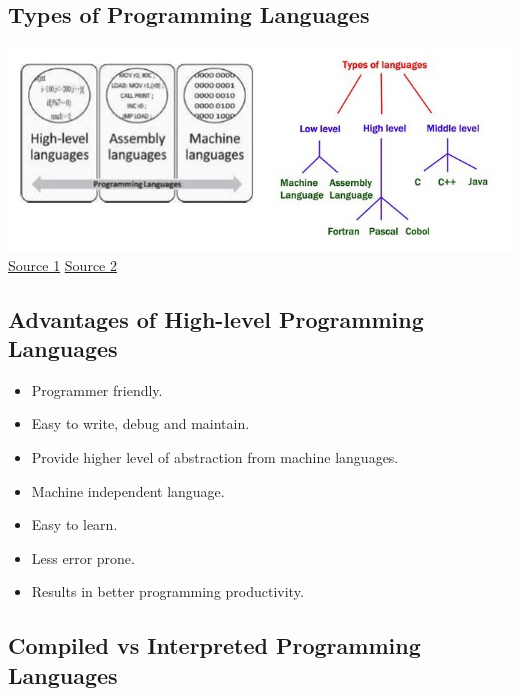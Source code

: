\documentclass[11pt]{article}
\makeatletter
\def\maxwidth{\ifdim\Gin@nat@width>\linewidth\linewidth
    \else\Gin@nat@width\fi}
\let\Oldincludegraphics\includegraphics
\renewcommand{\includegraphics}[1]{\Oldincludegraphics[width=.8\maxwidth]{#1}}
\providecommand{\tightlist}{%
      \setlength{\itemsep}{0pt}\setlength{\parskip}{0pt}}
\makeatother
\begin{document}
    \hypertarget{types-of-programming-languages}{%
\subsection{Types of Programming
Languages}\label{types-of-programming-languages}}

\includegraphics{figs/proglangtypes.jpg}
\href{http://4.bp.blogspot.com/-NvijJmjC13I/TmIbqlKKl8I/AAAAAAAAA3Q/mK4Nmy43en8/s1600/Untitled-1+\%25281\%2529.jpg}{Source
1}
\href{https://studyin24.com/wp-content/uploads/2018/12/Programming-language-types.jpg}{Source
2}

    \hypertarget{advantages-of-high-level-programming-languages}{%
\subsection{Advantages of High-level Programming
Languages}\label{advantages-of-high-level-programming-languages}}

\begin{itemize}
\tightlist
\item
  Programmer friendly.
\item
  Easy to write, debug and maintain.
\item
  Provide higher level of abstraction from machine languages.
\item
  Machine independent language.
\item
  Easy to learn.
\item
  Less error prone.
\item
  Results in better programming productivity.
\end{itemize}

    \hypertarget{compiled-vs-interpreted-programming-languages}{%
\subsection{Compiled vs Interpreted Programming
Languages}\label{compiled-vs-interpreted-programming-languages}}
\end{document}
